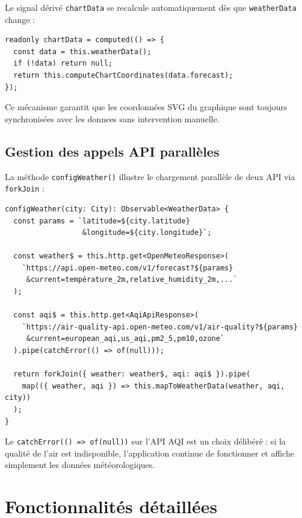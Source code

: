 \documentclass[12pt,a4paper]{article}
\begin{document}
Le signal dérivé \texttt{chartData} se recalcule automatiquement dès que \texttt{weatherData} change :

\begin{lstlisting}[style=angular, caption={Signal computed pour les coordonnees du graphique}]
readonly chartData = computed(() => {
  const data = this.weatherData();
  if (!data) return null;
  return this.computeChartCoordinates(data.forecast);
});
\end{lstlisting}

Ce mécanisme garantit que les coordonnées SVG du graphique sont toujours synchronisées avec les donnees sans intervention manuelle.

\subsection{Gestion des appels API parallèles}

La méthode \texttt{configWeather()} illustre le chargement parallèle de deux API via \texttt{forkJoin} :

\begin{lstlisting}[style=angular, caption={Chargement parallele des API meteo et qualité de l'air}]
configWeather(city: City): Observable<WeatherData> {
  const params = `latitude=${city.latitude}
                  &longitude=${city.longitude}`;

  const weather$ = this.http.get<OpenMeteoResponse>(
    `https://api.open-meteo.com/v1/forecast?${params}
     &current=température_2m,relative_humidity_2m,...`
  );

  const aqi$ = this.http.get<AqiApiResponse>(
    `https://air-quality-api.open-meteo.com/v1/air-quality?${params}
     &current=european_aqi,us_aqi,pm2_5,pm10,ozone`
  ).pipe(catchError(() => of(null)));

  return forkJoin({ weather: weather$, aqi: aqi$ }).pipe(
    map(({ weather, aqi }) => this.mapToWeatherData(weather, aqi, city))
  );
}
\end{lstlisting}

Le \texttt{catchError(() => of(null))} sur l'API AQI est un choix délibéré : si la qualité de l'air est indisponible, l'application continue de fonctionner et affiche simplement les données météorologiques.

\newpage
\section{Fonctionnalités détaillées}
\label{sec:features}
\end{document}
